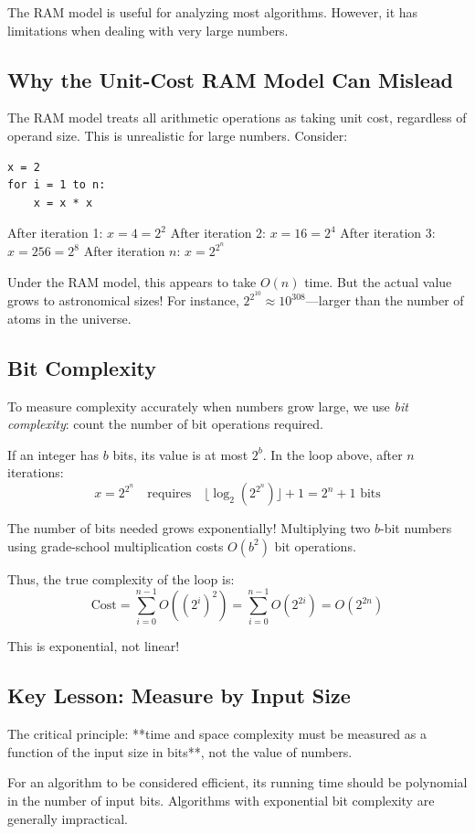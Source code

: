 \documentclass[11pt]{article}
\begin{document}
The RAM model is useful for analyzing most algorithms. However, it has limitations when dealing with very large numbers.

\subsection*{Why the Unit-Cost RAM Model Can Mislead}
The RAM model treats all arithmetic operations as taking unit cost, regardless of operand size. This is unrealistic for large numbers. Consider:

\begin{lstlisting}
x = 2
for i = 1 to n:
    x = x * x
\end{lstlisting}

After iteration 1: $x = 4 = 2^2$
After iteration 2: $x = 16 = 2^4$
After iteration 3: $x = 256 = 2^8$
After iteration $n$: $x = 2^{2^n}$

Under the RAM model, this appears to take $O(n)$ time. But the actual value grows to astronomical sizes! For instance, $2^{2^{10}} \approx 10^{308}$—larger than the number of atoms in the universe.

\subsection*{Bit Complexity}
To measure complexity accurately when numbers grow large, we use \emph{bit complexity}: count the number of bit operations required.

If an integer has $b$ bits, its value is at most $2^b$. In the loop above, after $n$ iterations:
\[
x = 2^{2^n} \quad \text{requires} \quad \lfloor \log_2(2^{2^n}) \rfloor + 1 = 2^n + 1 \text{ bits}
\]

The number of bits needed grows exponentially! Multiplying two $b$-bit numbers using grade-school multiplication costs $O(b^2)$ bit operations.

Thus, the true complexity of the loop is:
\[
\text{Cost} = \sum_{i=0}^{n-1} O((2^i)^2) = \sum_{i=0}^{n-1} O(2^{2i}) = O(2^{2n})
\]

This is exponential, not linear!

\subsection*{Key Lesson: Measure by Input Size}
The critical principle: **time and space complexity must be measured as a function of the input size in bits**, not the value of numbers.

For an algorithm to be considered efficient, its running time should be polynomial in the number of input bits. Algorithms with exponential bit complexity are generally impractical.
\end{document}

